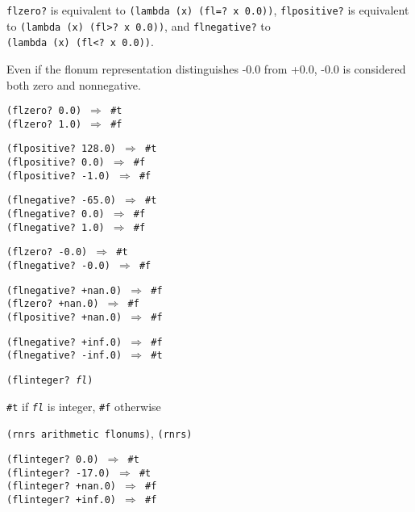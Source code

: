 \texttt{flzero?} is equivalent to \texttt{(lambda (x) (fl=? x 0.0))},
\texttt{flpositive?} is equivalent to \texttt{(lambda (x) (fl\textgreater{}? x 0.0))}, and
\texttt{flnegative?} to \texttt{(lambda (x) (fl\textless{}? x 0.0))}.

Even if the flonum representation distinguishes -0.0 from +0.0, -0.0 is
considered both zero and nonnegative.


\begin{alltt}
(flzero? 0.0) \(\Rightarrow\) \#{}t
(flzero? 1.0) \(\Rightarrow\) \#{}f

(flpositive? 128.0) \(\Rightarrow\) \#{}t
(flpositive? 0.0) \(\Rightarrow\) \#{}f
(flpositive? -1.0) \(\Rightarrow\) \#{}f

(flnegative? -65.0) \(\Rightarrow\) \#{}t
(flnegative? 0.0) \(\Rightarrow\) \#{}f
(flnegative? 1.0) \(\Rightarrow\) \#{}f

(flzero? -0.0) \(\Rightarrow\) \#{}t
(flnegative? -0.0) \(\Rightarrow\) \#{}f

(flnegative? +nan.0) \(\Rightarrow\) \#{}f
(flzero? +nan.0) \(\Rightarrow\) \#{}f
(flpositive? +nan.0) \(\Rightarrow\) \#{}f

(flnegative? +inf.0) \(\Rightarrow\) \#{}f
(flnegative? -inf.0) \(\Rightarrow\) \#{}t
\end{alltt}

\begin{description}

\label{objects_s180}\item[procedure] \texttt{(flinteger? \textit{fl})}



\item[returns] \texttt{\#{}t} if \texttt{\textit{fl}} is integer, \texttt{\#{}f} otherwise


\item[libraries] \texttt{(rnrs arithmetic flonums)}, \texttt{(rnrs)}
\end{description}


\begin{alltt}
(flinteger? 0.0) \(\Rightarrow\) \#{}t
(flinteger? -17.0) \(\Rightarrow\) \#{}t
(flinteger? +nan.0) \(\Rightarrow\) \#{}f
(flinteger? +inf.0) \(\Rightarrow\) \#{}f
\end{alltt}

